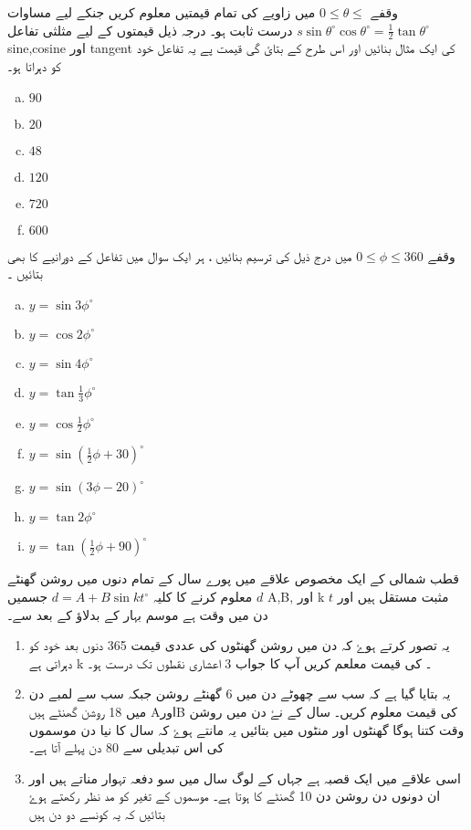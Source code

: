 
وقفے \( 0 \leqslant \theta \leqslant \)  میں زاویے کی تمام قیمتیں معلوم کریں جنکے لیے مساوات \( s\sin\theta^{\circ}\cos\theta^{\circ}=\frac{1}{2}\tan\theta^{\circ} \) درست ثابت ہو۔
درجہ ذیل قیمتوں کے لیے مثلثی تفاعل sine,cosine   اور  tangent کی ایک مثال بنائیں اور اس طرح کے بتائ گی قیمت پے یہ تفاعل خود کو دہراتا ہو۔
\begin{multicols}{3}
\begin{enumerate}[a.]
\item \( 90 \) 
\item \( 20 \) 
\item \( 48 \) 
\item \( 120 \) 
\item \( 720 \) 
\item \( 600 \) 
\end{enumerate}
\end{multicols}
وقفے \( 0 \leqslant \phi \leqslant 360 \) میں درج ذیل کی ترسیم بنائیں ، ہر ایک سوال میں تفاعل کے دورانیے کا بھی بتائیں ۔ 

\begin{multicols}{3}
\begin{enumerate}[a.]
\item \( y=\sin 3\phi^{\circ} \) 
\item \( y=\cos 2\phi^{\circ} \) 
\item \( y=\sin 4\phi^{\circ} \) 
\item \( y=\tan \frac{1}{3}\phi^{\circ} \) 
\item \( y=\cos \frac{1}{2}\phi^{\circ} \) 
\item \( y=\sin\left(\frac{1}{2}\phi+30\right)^{\circ} \) 
\item \( y=\sin\left(3\phi-20\right)^{\circ} \) 
\item \( y=\tan 2\phi^{\circ} \) 
\item \( y=\tan \left(\frac{1}{2}\phi+90\right)^{\circ} \) 
\end{enumerate}
\end{multicols}

قطب شمالی کے ایک مخصوص علاقے میں  پورے سال کے تمام  دنوں  میں روشن گھنٹے \( d \)  معلوم کرنے کا کلیہ \( d=A+B\sin kt^{\circ} \) جسمیں A,B,        اور  k
مثبت مستقل ہیں اور \( t \)  دن میں وقت ہے موسم بہار کے بدلاؤ کے بعد سے۔
\begin{enumerate}
\item        یہ تصور کرتے ہوۓ کہ دن میں روشن گھنٹوں کی عددی قیمت 365 دنوں بعد خود کو دہراتی ہے
k ۔  کی قیمت معلعم کریں  
آپ کا جواب 3 اعشاری نقطوں تک درست ہو۔
\item        یہ بتایا گیا ہے کہ سب سے چھوٹے دن میں 6 گھنٹے روشن جبکہ سب سے لمبے دن میں 18 روشن گھنٹے ہیں 
AاورB
کی قیمت معلوم کریں۔ سال کے نۓ دن میں روشن وقت کتنا ہوگا گھنٹوں اور منٹوں میں بتائیں یہ مانتے ہوۓ کہ سال کا نیا دن موسموں کی اس تبدیلی سے 80 دن پہلے آتا ہے۔
\item
اسی علاقے میں ایک قصبہ ہے جہاں کے لوگ سال میں سو دفعہ تہوار مناتے ہیں اور ان دونوں دن روشن دن 10 گھنٹے کا ہوتا ہے۔                    موسموں کے تغیر کو مد نظر رکھتے ہوۓ بتائیں کہ یہ کونسے دو دن ہیں
\end{enumerate}

